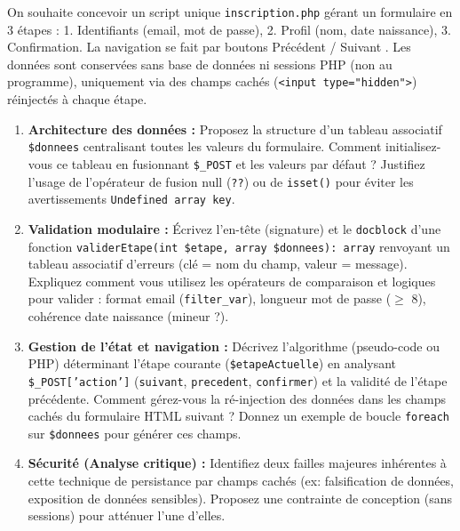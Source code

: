 \documentclass[11pt]{article}
\begin{document}
\begin{exercice}
On souhaite concevoir un script unique \texttt{inscription.php} gérant un formulaire en 3 étapes : 1. Identifiants (email, mot de passe), 2. Profil (nom, date naissance), 3. Confirmation. La navigation se fait par boutons \og Précédent \fg / \og Suivant \fg. Les données sont conservées sans base de données ni sessions PHP (non au programme), uniquement via des champs cachés (\texttt{<input type="hidden">}) réinjectés à chaque étape.

\begin{enumerate}
    \item \textbf{Architecture des données :} Proposez la structure d'un tableau associatif \texttt{\$donnees} centralisant toutes les valeurs du formulaire. Comment initialisez-vous ce tableau en fusionnant \texttt{\$\_POST} et les valeurs par défaut ? Justifiez l'usage de l'opérateur de fusion null (\texttt{??}) ou de \texttt{isset()} pour éviter les avertissements \texttt{Undefined array key}.
    \item \textbf{Validation modulaire :} Écrivez l'en-tête (signature) et le \texttt{docblock} d'une fonction \texttt{validerEtape(int \$etape, array \$donnees): array} renvoyant un tableau associatif d'erreurs (clé = nom du champ, valeur = message). Expliquez comment vous utilisez les opérateurs de comparaison et logiques pour valider : format email (\texttt{filter\_var}), longueur mot de passe ($\ge$ 8), cohérence date naissance (mineur ?).
    \item \textbf{Gestion de l'état et navigation :} Décrivez l'algorithme (pseudo-code ou PHP) déterminant l'étape courante (\texttt{\$etapeActuelle}) en analysant \texttt{\$\_POST['action']} (\texttt{suivant}, \texttt{precedent}, \texttt{confirmer}) et la validité de l'étape précédente. Comment gérez-vous la ré-injection des données dans les champs cachés du formulaire HTML suivant ? Donnez un exemple de boucle \texttt{foreach} sur \texttt{\$donnees} pour générer ces champs.
    \item \textbf{Sécurité (Analyse critique) :} Identifiez deux failles majeures inhérentes à cette technique de persistance par champs cachés (ex: falsification de données, exposition de données sensibles). Proposez une contrainte de conception (sans sessions) pour atténuer l'une d'elles.
\end{enumerate}
\end{exercice}
\end{document}
